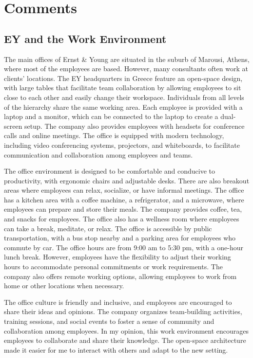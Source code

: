 \chapter{Comments}
\label{ch:comments}

\section{EY and the Work Environment}

The main offices of Ernst \& Young are situated in the suburb of Marousi,
Athens, where most of the employees are based. However, many consultants often
work at clients' locations. The EY headquarters in Greece feature an open-space
design, with large tables that facilitate team collaboration by allowing
employees to sit close to each other and easily change their workspace.
Individuals from all levels of the hierarchy share the same working area. Each
employee is provided with a laptop and a monitor, which can be connected to the
laptop to create a dual-screen setup. The company also provides employees with
headsets for conference calls and online meetings. The office is equipped with
modern technology, including video conferencing systems, projectors, and
whiteboards, to facilitate communication and collaboration among employees and
teams.

The office environment is designed to be comfortable and conducive to
productivity, with ergonomic chairs and adjustable desks. There are also
breakout areas where employees can relax, socialize, or have informal meetings.
The office has a kitchen area with a coffee machine, a refrigerator, and a
microwave, where employees can prepare and store their meals. The company
provides coffee, tea, and snacks for employees. The office also has a wellness
room where employees can take a break, meditate, or relax. The office is
accessible by public transportation, with a bus stop nearby and a parking area
for employees who commute by car. The office hours are from 9:00 am to 5:30 pm,
with a one-hour lunch break. However, employees have the flexibility to adjust
their working hours to accommodate personal commitments or work requirements.
The company also offers remote working options, allowing employees to work from
home or other locations when necessary.

The office culture is friendly and inclusive, and employees are encouraged to
share their ideas and opinions. The company organizes team-building activities,
training sessions, and social events to foster a sense of community and
collaboration among employees. In my opinion, this work environment encourages
employees to collaborate and share their knowledge. The open-space architecture
made it easier for me to interact with others and adapt to the new setting.

